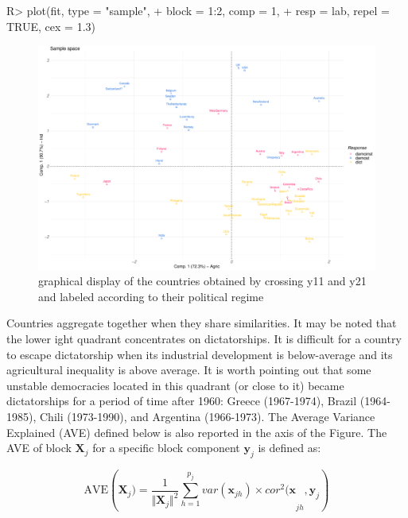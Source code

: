 \documentclass[
]{jss}
\begin{document}
\begin{CodeChunk}
\begin{CodeInput}
R> plot(fit, type = "sample",
+      block = 1:2, comp = 1,
+      resp = lab, repel = TRUE, cex = 1.3)
\end{CodeInput}
\begin{figure}

{\centering \includegraphics{RGCCA_files/figure-latex/unnamed-chunk-11-1} 

}

\caption[graphical display of the countries obtained by crossing y11 and y21 and labeled according to their political regime]{graphical display of the countries obtained by crossing y11 and y21 and labeled according to their political regime}\label{fig:unnamed-chunk-11}
\end{figure}
\end{CodeChunk}

\normalsize

Countries aggregate together when they share similarities. It may be
noted that the lower ight quadrant concentrates on dictatorships. It is
difficult for a country to escape dictatorship when its industrial
development is below-average and its agricultural inequality is above
average. It is worth pointing out that some unstable democracies located
in this quadrant (or close to it) became dictatorships for a period of
time after 1960: Greece (1967-1974), Brazil (1964-1985), Chili
(1973-1990), and Argentina (1966-1973). The Average Variance Explained
(AVE) defined below is also reported in the axis of the Figure. The AVE
of block \(\mathbf{X}_j\) for a specific block component
\(\mathbf{y}_j\) is defined as:

\begin{equation}
\mathrm{AVE}({\mathbf{X}_j)=  \frac{1}{\Vert \mathbf{X}_j \Vert^2} \sum_{h=1}^{p_j} var(\mathbf{x}_{jh}) \times cor^2( \mathbf{x}}_{jh},\mathbf{y}_j)
\end{equation}
\end{document}
